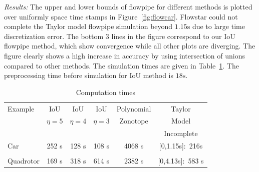 \emph{Results:}  The upper and lower bounds of flowpipe for different
  methods is plotted over uniformly space time stamps in
  Figure~\ref{fig:flowcar}.  Flowstar could not complete the Taylor
  model flowpipe simulation beyond $1.15\si{\second}$ due to large
  time discretization error.  The bottom 3 lines in the figure
  correspond to our IoU flowpipe method, which show convergence while
  all other plots are diverging.  The figure clearly shows a high
  increase in accuracy by using intersection of unions compared to
  other methods.  The simulation times are given in
  Table~\ref{tab:comptimes}.  The preprocessing time before simulation
  for IoU method is $18\si{\second}$.
\begin{table}
\caption{Computation times}\label{tab:comptimes}
\begin{tabular}{|l|c|c|c|c|c|}
\hline
Example & IoU  & IoU  & IoU  &
Polynomial & Taylor\\
& $\eta = 5$ & $\eta = 4$ & $\eta = 3$ & Zonotope & Model \\
\hline
& & & & & {\color{red}Incomplete}\\
Car & 252 s & 128 s & 108 s & 4068 s& {\color{red}[0,1.15s]:~216s}\\
\hline
& & & & &\\
Quadrotor & 169 s & 318 s & 614 s & 2382 s &
{\color{red}[0,4.13s]:~583 s} \\
\hline
\end{tabular}
\end{table}
%
